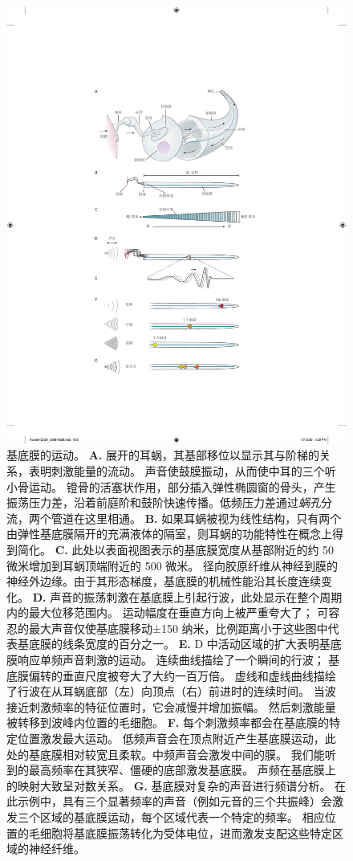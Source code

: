 \begin{figure}[htbp]
	\centering
	\includegraphics[width=0.65\linewidth]{chap26/fig_26_3}
	\caption{基底膜的运动。
		\textbf{A.} 展开的耳蜗，其基部移位以显示其与阶梯的关系，表明刺激能量的流动。
		声音使鼓膜振动，从而使中耳的三个听小骨运动。
		镫骨的活塞状作用，部分插入弹性椭圆窗的骨头，产生振荡压力差，沿着前庭阶和鼓阶快速传播。低频压力差通过\textit{蜗孔}分流，两个管道在这里相通。
		\textbf{B.} 如果耳蜗被视为线性结构，只有两个由弹性基底膜隔开的充满液体的隔室，则耳蜗的功能特性在概念上得到简化。
		\textbf{C.} 此处以表面视图表示的基底膜宽度从基部附近的约 50 微米增加到耳蜗顶端附近的 500 微米。
		径向胶原纤维从神经到膜的神经外边缘。由于其形态梯度，基底膜的机械性能沿其长度连续变化。
		\textbf{D.} 声音的振荡刺激在基底膜上引起行波，此处显示在整个周期内的最大位移范围内。
		运动幅度在垂直方向上被严重夸大了；
		可容忍的最大声音仅使基底膜移动±150 纳米，比例距离小于这些图中代表基底膜的线条宽度的百分之一。
		\textbf{E.} D 中活动区域的扩大表明基底膜响应单频声音刺激的运动。
		连续曲线描绘了一个瞬间的行波；
		基底膜偏转的垂直尺度被夸大了大约一百万倍。
		虚线和虚线曲线描绘了行波在从耳蜗底部（左）向顶点（右）前进时的连续时间。
		当波接近刺激频率的特征位置时，它会减慢并增加振幅。
		然后刺激能量被转移到波峰内位置的毛细胞。
		\textbf{F.} 每个刺激频率都会在基底膜的特定位置激发最大运动。
		低频声音会在顶点附近产生基底膜运动，此处的基底膜相对较宽且柔软。中频声音会激发中间的膜。
		我们能听到的最高频率在其狭窄、僵硬的底部激发基底膜。
		声频在基底膜上的映射大致呈对数关系。
		\textbf{G.} 基底膜对复杂的声音进行频谱分析。
		在此示例中，具有三个显著频率的声音（例如元音的三个共振峰）会激发三个区域的基底膜运动，每个区域代表一个特定的频率。
		相应位置的毛细胞将基底膜振荡转化为受体电位，进而激发支配这些特定区域的神经纤维。}
	\label{fig:26_3}
\end{figure}


